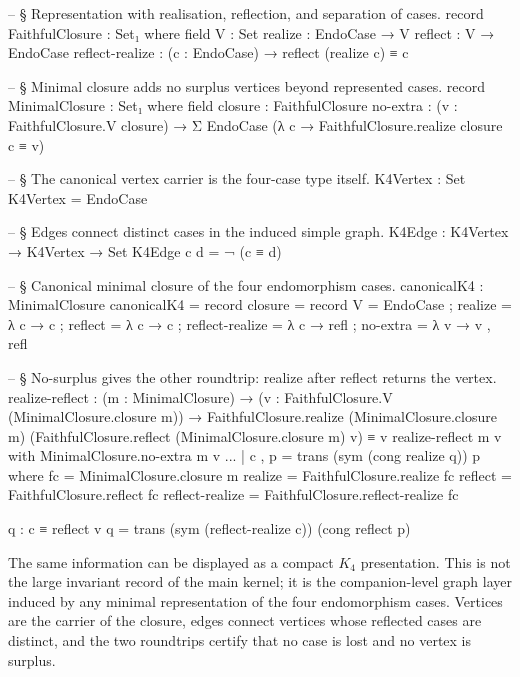 \documentclass[11pt]{article}
\begin{document}
\begin{code}
-- § Representation with realisation, reflection, and separation of cases.
record FaithfulClosure : Set₁ where
  field
    V               : Set
    realize         : EndoCase → V
    reflect         : V → EndoCase
    reflect-realize : (c : EndoCase) → reflect (realize c) ≡ c

-- § Minimal closure adds no surplus vertices beyond represented cases.
record MinimalClosure : Set₁ where
  field
    closure  : FaithfulClosure
    no-extra : (v : FaithfulClosure.V closure) →
               Σ EndoCase (λ c → FaithfulClosure.realize closure c ≡ v)

  -- § The canonical vertex carrier is the four-case type itself.
K4Vertex : Set
K4Vertex = EndoCase

  -- § Edges connect distinct cases in the induced simple graph.
K4Edge : K4Vertex → K4Vertex → Set
K4Edge c d = ¬ (c ≡ d)

  -- § Canonical minimal closure of the four endomorphism cases.
canonicalK4 : MinimalClosure
canonicalK4 = record
  { closure = record
      { V               = EndoCase
      ; realize         = λ c → c
      ; reflect         = λ c → c
      ; reflect-realize = λ c → refl
      }
  ; no-extra = λ v → v , refl
  }

-- § No-surplus gives the other roundtrip: realize after reflect returns the vertex.
realize-reflect :
  (m : MinimalClosure) →
  (v : FaithfulClosure.V (MinimalClosure.closure m)) →
  FaithfulClosure.realize (MinimalClosure.closure m)
    (FaithfulClosure.reflect (MinimalClosure.closure m) v)
  ≡ v
realize-reflect m v with MinimalClosure.no-extra m v
... | c , p = trans (sym (cong realize q)) p
  where
    fc = MinimalClosure.closure m
    realize = FaithfulClosure.realize fc
    reflect = FaithfulClosure.reflect fc
    reflect-realize = FaithfulClosure.reflect-realize fc

    q : c ≡ reflect v
    q = trans (sym (reflect-realize c)) (cong reflect p)
\end{code}

The same information can be displayed as a compact $K_4$ presentation.
This is not the large invariant record of the main kernel; it is the
companion-level graph layer induced by any minimal representation of the
four endomorphism cases.  Vertices are the carrier of the closure,
edges connect vertices whose reflected cases are distinct, and the two
roundtrips certify that no case is lost and no vertex is surplus.
\end{document}
